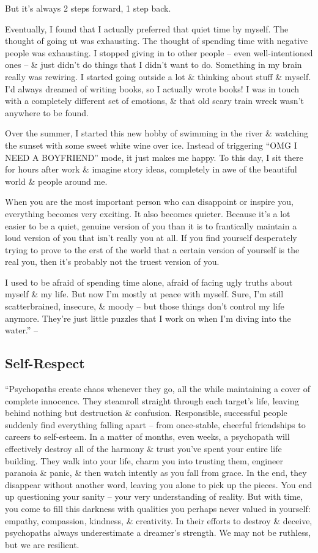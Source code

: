 \documentclass{article}
\numberwithin{equation}{section}
\begin{document}
But it's always 2 steps forward, 1 step back.

Eventually, I found that I actually preferred that quiet time by myself. The thought of going ut was exhausting. The thought of spending time with negative people was exhausting. I stopped giving in to other people -- even well-intentioned ones -- \& just didn't do things that I didn't want to do. Something in my brain really was rewiring. I started going outside a lot \& thinking about stuff \& myself. I'd always dreamed of writing books, so I actually wrote books! I was in touch with a completely different set of emotions, \& that old scary train wreck wasn't anywhere to be found.

Over the summer, I started this new hobby of swimming in the river \& watching the sunset with some sweet white wine over ice. Instead of triggering ``OMG I NEED A BOYFRIEND'' mode, it just makes me happy. To this day, I sit there for hours after work \& imagine story ideas, completely in awe of the beautiful world \& people around me.

When you are the most important person who can disappoint or inspire you, everything becomes very exciting. It also becomes quieter. Because it's a lot easier to be a quiet, genuine version of you than it is to frantically maintain a loud version of you that isn't really you at all. If you find yourself desperately trying to prove to the erst of the world that a certain version of yourself is the real you, then it's probably not the truest version of you.

I used to be afraid of spending time alone, afraid of facing ugly truths about myself \& my life. But now I'm mostly at peace with myself. Sure, I'm still scatterbrained, insecure, \& moody -- but those things don't control my life anymore. They're just little puzzles that I work on when I'm diving into the water.'' -- \cite[pp. 156--159]{MacKenzie2015}

\subsection{Self-Respect}
``Psychopaths create chaos whenever they go, all the while maintaining a cover of complete innocence. They steamroll straight through each target's life, leaving behind nothing but destruction \& confusion. Responsible, successful people suddenly find everything falling apart -- from once-stable, cheerful friendships to careers to self-esteem. In a matter of months, even weeks, a psychopath will effectively destroy all of the harmony \& trust you've spent your entire life building. They walk into your life, charm you into trusting them, engineer paranoia \& panic, \& then watch intently as you fall from grace. In the end, they disappear without another word, leaving you alone to pick up the pieces. You end up questioning your sanity -- your very understanding of reality. But with time, you come to fill this darkness with qualities you perhaps never valued in yourself: empathy, compassion, kindness, \& creativity. In their efforts to destroy \& deceive, psychopaths always underestimate a dreamer's strength. We may not be ruthless, but we are resilient.
\end{document}
